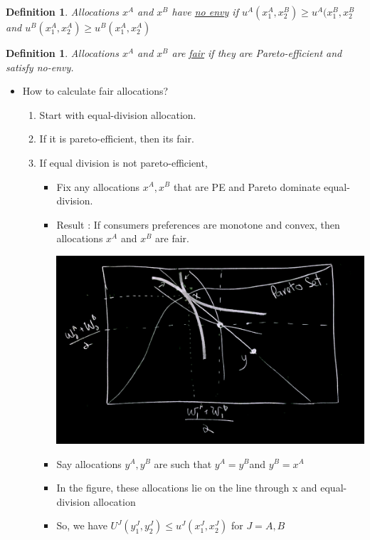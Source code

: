 \documentclass[twoside]{article}
\newtheorem{definition}[theorem]{Definition}
\begin{document}
\begin{definition} Allocations \(x^A\) and \(x^B\) have \underline{no envy} if \(u^A(x_1^A, x_2^B) \geq u^A(x_1^B, x_2^B\) and 
\(u^B(x_1^A, x_2^A) \geq u^B(x_1^A, x_2^A)\)
\end{definition}
\begin{definition}
Allocations \(x^A\) and \(x^B\) are \underline{fair} if they are Pareto-efficient and satisfy no-envy. 
\end{definition}
\begin{itemize}
\item How to calculate fair allocations?
\begin{enumerate}
\item Start with equal-division allocation.
\item If it is pareto-efficient, then its fair.
\item If equal division is not pareto-efficient, 
\begin{itemize}
\item Fix any allocations \(x^A, x^B\) that are PE and Pareto dominate equal-division.
\item Result : If consumers preferences are monotone and convex, then allocations \(x^A\) and \(x^B\) are fair. 
\begin{center}
\includegraphics[scale=0.1]{28}
\end{center}
\item Say allocations \(y^A, y^B\) are such that \(y^A = y^B\)and \(y^B = x^A\)
\item In the figure, these allocations lie on the line through x and equal-division allocation
\item So, we have \(U^J(y^J_1, y^J_2) \leq u^J(x_1^J, x_2^J)\) for \(J=A, B\)
\end{itemize}
\end{enumerate}
\end{itemize}
\end{document}

